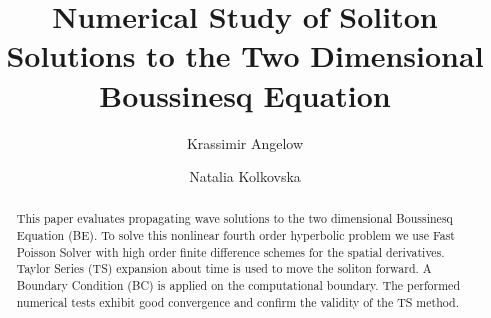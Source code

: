 \documentclass[11pt,a4paper,twoside]{article}
\begin{document}

\title{Numerical Study of Soliton Solutions to the Two Dimensional Boussinesq  Equation}




\author{Krassimir Angelow}
\address{Bulgarian Academy of Sciences, Institute of Mathematics and Informatics, ul. Acad. G. Bonchev, block 8, 1113 Sofia, Bulgaria}

\author{Natalia Kolkovska}
\address{Bulgarian Academy of Sciences, Institute of Mathematics and Informatics, ul. Acad. G. Bonchev, block 8, 1113 Sofia, Bulgaria}



\BeginPaper %


\newcommand{\ep}{\varepsilon}
\newcommand{\eps}[1]{{#1}_{\varepsilon}}
\newcommand{\rf}[1]{(\ref{#1})}
\newcommand{\RR}{\mathbb{R}}



\begin{abstract}
This paper evaluates propagating wave solutions to the two dimensional Boussinesq Equation (BE). To solve this nonlinear fourth order hyperbolic problem we use Fast Poisson Solver with high order finite difference schemes for the spatial derivatives. Taylor Series (TS) expansion about time is used to move the soliton forward. A Boundary Condition (BC) is applied on the computational boundary. The performed numerical tests exhibit good convergence and confirm the validity of the TS method.




\end{abstract}
\end{document}
